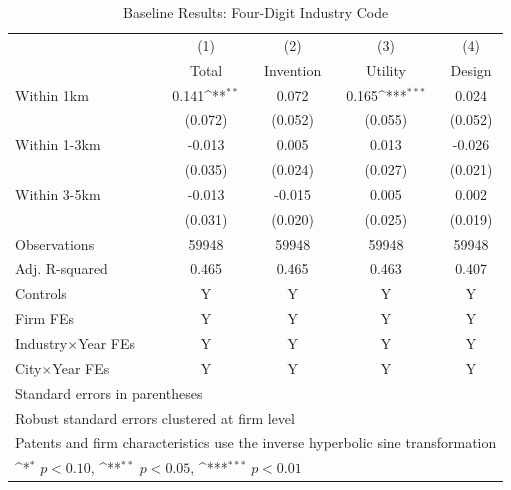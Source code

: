 \begin{table}[htbp]\centering
\def\sym#1{\ifmmode^{#1}\else\(^{#1}\)\fi}
\caption{Baseline Results: Four-Digit Industry Code}
\label{tab:baselinefourdigit}
\begin{tabular}{l*{4}{c}}
\toprule
            &\multicolumn{1}{c}{(1)}&\multicolumn{1}{c}{(2)}&\multicolumn{1}{c}{(3)}&\multicolumn{1}{c}{(4)}\\
            &\multicolumn{1}{c}{Total}&\multicolumn{1}{c}{Invention}&\multicolumn{1}{c}{Utility}&\multicolumn{1}{c}{Design}\\
\midrule
Within 1km  &       0.141\sym{**} &       0.072         &       0.165\sym{***}&       0.024         \\
            &     (0.072)         &     (0.052)         &     (0.055)         &     (0.052)         \\
\addlinespace
Within 1-3km&      -0.013         &       0.005         &       0.013         &      -0.026         \\
            &     (0.035)         &     (0.024)         &     (0.027)         &     (0.021)         \\
\addlinespace
Within 3-5km&      -0.013         &      -0.015         &       0.005         &       0.002         \\
            &     (0.031)         &     (0.020)         &     (0.025)         &     (0.019)         \\
\midrule
Observations&       59948         &       59948         &       59948         &       59948         \\
Adj. R-squared&       0.465         &       0.465         &       0.463         &       0.407         \\
Controls    &           Y         &           Y         &           Y         &           Y         \\
Firm FEs    &           Y         &           Y         &           Y         &           Y         \\
Industry$\times$Year FEs&           Y         &           Y         &           Y         &           Y         \\
City$\times$Year FEs&           Y         &           Y         &           Y         &           Y         \\
\bottomrule
\multicolumn{5}{l}{\footnotesize Standard errors in parentheses}\\
\multicolumn{5}{l}{\footnotesize Robust standard errors clustered at firm level}\\
\multicolumn{5}{l}{\footnotesize Patents and firm characteristics use the inverse hyperbolic sine transformation}\\
\multicolumn{5}{l}{\footnotesize \sym{*} \(p<0.10\), \sym{**} \(p<0.05\), \sym{***} \(p<0.01\)}\\
\end{tabular}
\end{table}